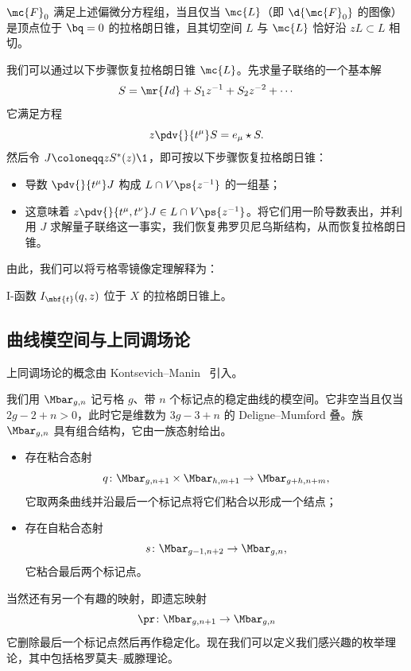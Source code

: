 \begin{thm}
    $\mc{F}_0$ 满足上述偏微分方程组，当且仅当 $\mc{L}$（即 $\d{\mc{F}_0}$ 的图像）是顶点位于 $\bq = 0$ 的拉格朗日锥，且其切空间 $L$ 与 $\mc{L}$ 恰好沿 $zL \subset L$ 相切。
\end{thm}

我们可以通过以下步骤恢复拉格朗日锥 $\mc{L}$。先求量子联络的一个基本解
\[ S = \mr{Id} + S_1 z^{-1} + S_2 z^{-2} + \cdots \]
它满足方程
\[ z \pdv{}{t^{\mu}}S = e_{\mu} \star S. \]
然后令 $J \coloneqq z S^*(z) \1$，即可按以下步骤恢复拉格朗日锥：
\begin{itemize}
    \item 导数 $\pdv{}{t^{\mu}} J$ 构成 $L \cap V\ps{z^{-1}}$ 的一组基；
    \item 这意味着 $z \pdv{}{t^{\mu},t^{\nu}} J \in L \cap V \ps{z^{-1}}$。将它们用一阶导数表出，并利用 $J$ 求解量子联络这一事实，我们恢复弗罗贝尼乌斯结构，从而恢复拉格朗日锥。
\end{itemize}

由此，我们可以将亏格零镜像定理解释为：
\begin{thm}
    I-函数 \(I_{\mbf{t}}(q,z)\) 位于 \(X\) 的拉格朗日锥上。
\end{thm}




\subsection{曲线模空间与上同调场论}%
\label{sub:Moduli of curves and CohFTs}

上同调场论的概念由 Kontsevich--Manin~\cite{KM1994} 引入。

我们用 $\Mbar_{g,n}$ 记亏格 $g$、带 $n$ 个标记点的稳定曲线的模空间。它非空当且仅当 $2g-2+n > 0$，此时它是维数为 $3g-3+n$ 的 Deligne–Mumford 叠。族 $\Mbar_{g,n}$ 具有组合结构，它由一族态射给出。
\begin{itemize}
    \item 存在粘合态射
        \[q \colon \Mbar_{g,n+1} \times \Mbar_{h, m+1} \to \Mbar_{g+h,n+m}, \]
        它取两条曲线并沿最后一个标记点将它们粘合以形成一个结点；
    \item 存在自粘合态射 \[s \colon \Mbar_{g-1,n+2} \to \Mbar_{g,n},\]
        它粘合最后两个标记点。
\end{itemize}
当然还有另一个有趣的映射，即遗忘映射
\[ \pr \colon \Mbar_{g,n+1} \to \Mbar_{g,n} \]
它删除最后一个标记点然后再作稳定化。现在我们可以定义我们感兴趣的枚举理论，其中包括格罗莫夫–威滕理论。

